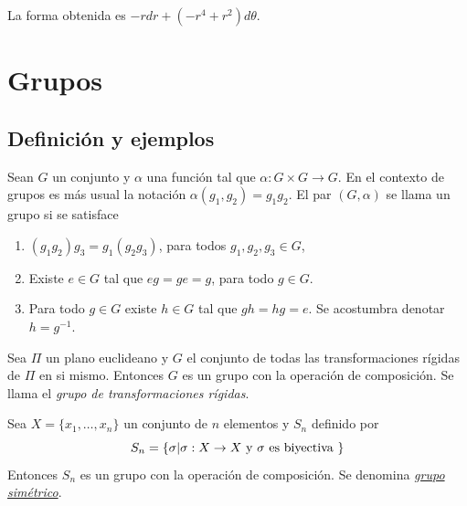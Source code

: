  

La forma obtenida es $-rdr+(-r^4+r^2)d\theta$.


\section{Grupos}

 \subsection{Definición y ejemplos}
\begin{definicion}[Grupo]
Sean $G$ un conjunto y $\alpha$ una función tal que   $\alpha:G\times G\to G$. En el contexto de grupos es más usual la notación  $\alpha(g_1,g_2)=g_1g_2$. El par $(G,\alpha)$ se llama un grupo si se satisface
\begin{enumerate}
\item $(g_1g_2)g_3=g_1(g_2g_3)$, para todos $g_1,g_2,g_3\in G$,
\item Existe $e\in G$ tal que $eg=ge=g$,  para todo $g\in G$.
\item Para todo $g\in G$ existe $h\in G$ tal que $gh=hg=e$. Se acostumbra denotar $h=g^{-1}$.
\end{enumerate}
\end{definicion}




\begin{ejemplo} Sea $\Pi$ un plano euclideano y $G$ el conjunto de todas las transformaciones rígidas de $\Pi$ en si mismo. Entonces $G$ es un grupo con la operación de composición. Se llama el \emph{grupo de transformaciones rígidas}.
 \end{ejemplo}


\begin{ejemplo}  Sea $X=\{x_1,\ldots,x_n\}$ un conjunto de $n$ elementos y $S_n$ definido por
\[S_n=\{\sigma|\sigma:X\to X\hbox{ y }\sigma \hbox{ es biyectiva }\}\]
Entonces $S_n$ es un grupo  con la operación de composición. Se denomina \href{http://es.wikipedia.org/wiki/Grupo_simétrico}{\emph{grupo simétrico}}.
 \end{ejemplo}

